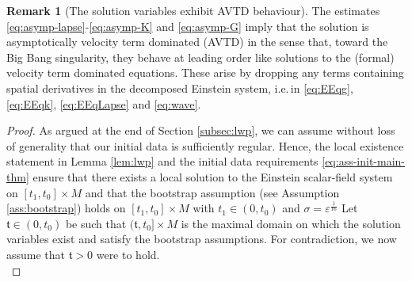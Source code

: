 \documentclass[11pt,leqno,textwidth=10cm]{amsart}
\numberwithin{equation}{section}
\theoremstyle{definition}
\newtheorem{remark}[definition]{Remark}
\theoremstyle{plain}
\newcommand{\1}{\mathbbm{1}}
\newcommand{\E}{\mathcal{E}}
\renewcommand{\epsilon}{\varepsilon}
\newcommand{\RE}{\bm{E}}
\newcommand{\RB}{\bm{B}}
\newcommand{\todo}[1]{\textcolor{red}{#1}}
\newcommand{\change}[1]{\color{black}#1\color{black}}
\begin{document}
\begin{remark}[The solution variables exhibit AVTD behaviour]\label{rem:AVTD} The estimates \eqref{eq:asymp-lapse}-\eqref{eq:asymp-K} and \eqref{eq:asymp-G} imply that the solution is asymptotically velocity term dominated (AVTD) in the sense that, toward the Big Bang singularity, they behave at leading order like solutions to the (formal) velocity term dominated equations. These arise by dropping any terms containing spatial derivatives in the decomposed Einstein system, i.e.\,in \eqref{eq:EEqg}, \eqref{eq:EEqk}, \eqref{eq:EEqLapse} and \eqref{eq:wave}.
\end{remark}
\begin{proof}
\change{As argued at the end of Section \ref{subsec:lwp}, we can assume without loss of generality that our initial data is sufficiently regular. Hence, the local existence statement in Lemma \ref{lem:lwp} and the initial data requirements \eqref{eq:ass-init-main-thm} ensure that there exists a local solution to the Einstein scalar-field system on $[t_1,t_0]\times M$ and that the bootstrap assumption (see Assumption \ref{ass:bootstrap}) holds }on $[t_1,t_0]\times M$ with $t_1\in(0,t_0)$ and $\sigma=\epsilon^\frac1{16}$%
Let $\mathfrak{t}\in(0,t_0)$ be such that $(\mathfrak{t},t_0]\times M$ is the maximal domain on which the solution variables exist and satisfy the bootstrap assumptions. For contradiction, we now assume that $\mathfrak{t}>0$ were to hold.\\


\end{proof}
\end{document}
